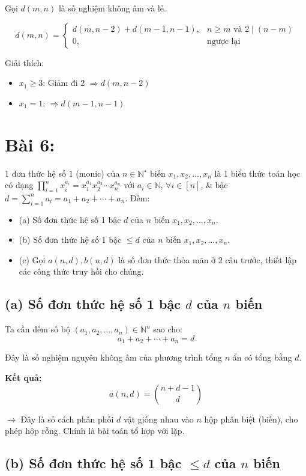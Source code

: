 \documentclass{article}
\begin{document}
	Gọi $d(m,n)$ là số nghiệm không âm và lẻ.
	
	\[
	d(m,n) =
	\begin{cases}
		d(m,n-2) + d(m-1,n-1), & n \ge m \text{ và } 2 \mid (n - m) \\
		0, & \text{ngược lại}
	\end{cases}
	\]
	
	Giải thích:
	\begin{itemize}
		\item $x_1 \ge 3$: Giảm đi 2 $\Rightarrow d(m,n-2)$
		\item $x_1 = 1$: $\Rightarrow d(m-1,n-1)$
	\end{itemize}
	
	\section*{Bài 6:}
	1 đơn thức hệ số $1$ (monic) của $n\in\mathbb{N}^\star$ biến $x_1,x_2,\ldots,x_n$ là 1 biểu thức toán học có dạng $\prod_{i=1}^n x_i^{a_i} = x_1^{a_1}x_2^{a_2}\cdots x_n^{a_n}$ với $a_i\in\mathbb{N}$, $\forall i\in[n]$, \& {\rm bậc} $d = \sum_{i=1}^n a_i = a_1 + a_2 + \cdots + a_n$. Đếm: 
	\begin{itemize}
		\item (a) Số đơn thức hệ số 1 bậc $d$ của $n$ biến $x_1,x_2,\ldots,x_n$.
		\item (b) Số đơn thức hệ số 1 bậc $\le d$ của $n$ biến $x_1,x_2,\ldots,x_n$.
		\item (c) Gọi $a(n,d),b(n,d)$ là số đơn thức thỏa mãn ở 2 câu trước, thiết lập các công thức truy hồi cho chúng.
	\end{itemize}
	  
	\subsection*{(a) Số đơn thức hệ số 1 bậc $d$ của $n$ biến}
	
	Ta cần đếm số bộ $(a_1, a_2, \ldots, a_n) \in \mathbb{N}^n$ sao cho:
	\[
	a_1 + a_2 + \cdots + a_n = d
	\]
	
	Đây là số nghiệm nguyên không âm của phương trình tổng $n$ ẩn có tổng bằng $d$.
	
	\textbf{Kết quả:}
	\[
	a(n,d) = \binom{n + d - 1}{d}
	\]
	
	$\rightarrow$ Đây là số cách phân phối $d$ vật giống nhau vào $n$ hộp phân biệt (biến), cho phép hộp rỗng. Chính là bài toán tổ hợp với lặp.
	
	\subsection*{(b) Số đơn thức hệ số 1 bậc $\le d$ của $n$ biến}
	
\end{document}
